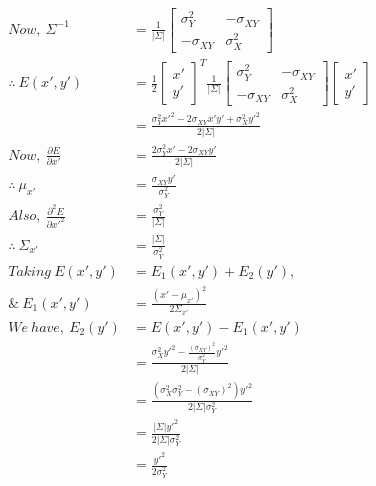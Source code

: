 \documentclass[a4paper,fleqn,11pt]{article}
\theoremstyle{mytheor}
\begin{document}
\begin{align*}
Now,\ \Sigma^{-1} & = \frac{1}{|\Sigma|}
					   \begin{bmatrix}
							\sigma^2_Y  & -\sigma_{XY} \\
						   -\sigma_{XY} &  \sigma^2_X
					   \end{bmatrix} \\
\therefore\ E (x', y') & = \frac{1}{2}
  		   			  \begin{bmatrix}
						x' \\
						y'
			 		  \end{bmatrix}^T
					  \frac{1}{|\Sigma|}
					  \begin{bmatrix}
							\sigma^2_Y  & -\sigma_{XY} \\
						   -\sigma_{XY} &  \sigma^2_X
					  \end{bmatrix}
				      \begin{bmatrix}
		   				x' \\
						y'
					  \end{bmatrix} \\
& = \frac{\sigma^2_Y x'^2 - 2\sigma_{XY}x' y' + \sigma^2_X y'^2}{2|\Sigma|} \\
Now,\ \frac{\partial E}{\partial x'} & = \frac{2\sigma^2_Y x' - 2\sigma_{XY}y'}{2|\Sigma|} \\
\therefore\ \mu_{x'} & = \frac{\sigma_{XY} y'}{\sigma^2_Y}\\
Also,\ \frac{\partial^2 E}{\partial x'^2} & = \frac{\sigma^2_Y}{|\Sigma|} \\
\therefore\ \Sigma_{x'} & =  \frac{|\Sigma|}{\sigma^2_Y} \\
Taking\ E (x', y') & = E_1 (x', y') + E_2 (y'), \\
\&\ E_1 (x', y') & = \frac{(x' - \mu_{x'})^2}{2\Sigma_{x'}} \\
We\ have,\ E_2 (y') & = E (x', y') - E_1 (x', y') \\
& = \frac{\sigma^2_X y'^2 - \frac{(\sigma_{XY})^2}
								  {\sigma^2_Y}y'^2}
		 {2|\Sigma|} \\
& = \frac{(\sigma^2_X \sigma^2_Y - (\sigma_{XY})^2)y'^2}
		 {2|\Sigma|\sigma^2_Y} \\
& = \frac{|\Sigma|y'^2}{2|\Sigma|\sigma^2_Y} \\
& = \frac{y'^2}{2\sigma^2_Y} \\
\end{align*}
\end{document}
